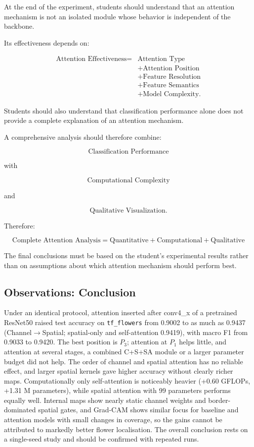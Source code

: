 \documentclass[10pt]{article}
\begin{document}
At the end of the experiment, students should understand that an attention
mechanism is not an isolated module whose behavior is independent of the
backbone.

Its effectiveness depends on:

\[
\boxed{
\begin{aligned}
\text{Attention Effectiveness}
={}&
\text{Attention Type}\\
&+
\text{Attention Position}\\
&+
\text{Feature Resolution}\\
&+
\text{Feature Semantics}\\
&+
\text{Model Complexity}.
\end{aligned}
}
\]

Students should also understand that classification performance alone does
not provide a complete explanation of an attention mechanism.

A comprehensive analysis should therefore combine:

\[
\boxed{
\text{Classification Performance}
}
\]

with

\[
\boxed{
\text{Computational Complexity}
}
\]

and

\[
\boxed{
\text{Qualitative Visualization}.
}
\]

Therefore:

\[
\boxed{
\text{Complete Attention Analysis}
=
\text{Quantitative}
+
\text{Computational}
+
\text{Qualitative}
}
\]

The final conclusions must be based on the student's experimental results
rather than on assumptions about which attention mechanism should perform
best.



\subsection*{Observations: Conclusion}
Under an identical protocol, attention inserted after conv4\_x of a pretrained ResNet50 raised test accuracy on \texttt{tf\_flowers} from 0.9002 to as much as 0.9437 (Channel$\to$Spatial; spatial-only and self-attention 0.9419), with macro F1 from 0.9033 to 0.9420. The best position is $P_3$; attention at $P_1$ helps little, and attention at several stages, a combined C+S+SA module or a larger parameter budget did not help. The order of channel and spatial attention has no reliable effect, and larger spatial kernels gave higher accuracy without clearly richer maps. Computationally only self-attention is noticeably heavier (+0.60 GFLOPs, +1.31 M parameters), while spatial attention with 99 parameters performs equally well. Internal maps show nearly static channel weights and border-dominated spatial gates, and Grad-CAM shows similar focus for baseline and attention models with small changes in coverage, so the gains cannot be attributed to markedly better flower localisation. The overall conclusion rests on a single-seed study and should be confirmed with repeated runs.
\end{document}
